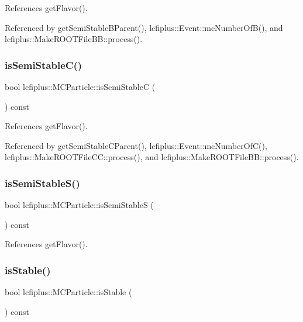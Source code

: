References get\+Flavor().



Referenced by get\+Semi\+Stable\+B\+Parent(), lcfiplus\+::\+Event\+::mc\+Number\+Of\+B(), and lcfiplus\+::\+Make\+R\+O\+O\+T\+File\+B\+B\+::process().

\mbox{\label{classlcfiplus_1_1MCParticle_a7df7cf30f2d3254714097de4620c4480}} 
\subsubsection{is\+Semi\+Stable\+C()}
{\footnotesize\ttfamily bool lcfiplus\+::\+M\+C\+Particle\+::is\+Semi\+StableC (\begin{DoxyParamCaption}{ }\end{DoxyParamCaption}) const}



References get\+Flavor().



Referenced by get\+Semi\+Stable\+C\+Parent(), lcfiplus\+::\+Event\+::mc\+Number\+Of\+C(), lcfiplus\+::\+Make\+R\+O\+O\+T\+File\+C\+C\+::process(), and lcfiplus\+::\+Make\+R\+O\+O\+T\+File\+B\+B\+::process().

\mbox{\label{classlcfiplus_1_1MCParticle_a224d0a17a13920bfb37ce1389022fc4d}} 
\subsubsection{is\+Semi\+Stable\+S()}
{\footnotesize\ttfamily bool lcfiplus\+::\+M\+C\+Particle\+::is\+Semi\+StableS (\begin{DoxyParamCaption}{ }\end{DoxyParamCaption}) const}



References get\+Flavor().

\mbox{\label{classlcfiplus_1_1MCParticle_a1d207f826749cea17ee5da67173e4519}} 
\subsubsection{is\+Stable()}
{\footnotesize\ttfamily bool lcfiplus\+::\+M\+C\+Particle\+::is\+Stable (\begin{DoxyParamCaption}{ }\end{DoxyParamCaption}) const}



